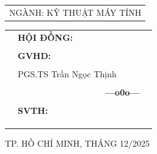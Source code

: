 \documentclass[11pt, a4paper]{report}
\theoremstyle{definition}
\begin{document}
\begin{titlepage}
\begin{center}
\begin{tabular}{c}
{\Large NGÀNH: KỸ THUẬT MÁY TÍNH}
\end{tabular}
\end{center}
\begin{table}[h]
\begin{tabular}{rll}
\hspace{5 cm} &  \textbf{\Large HỘI ĐỒNG:} {}
\\
\vspace{2cm}
\\
\hspace{5cm} &   \textbf{\Large GVHD:} \hspace{1.3cm}{\Large Th.S Huỳnh Phúc Nghị}
\\
\\
& \hspace{3.23cm} \Large{PGS.TS Trần Ngọc Thịnh}
\\
\\
\hspace{4 cm} &     \textbf{$\;$ $\;$$\;$$\;$$\;$$\;$$\;$$\;$$\;$$\;$$\;$$\;$$\;$$\;$$\;$$\;$$\;$$\;$$\;$$\;$$\;$$\;$$\;$$\;$$\;$$\;$$\;$$\;$$\;$$\;$$\;$$\;$$\;$$\;$ \Large ---o0o---} 
\\
\\
\hspace{4 cm} &   \textbf{\Large SVTH:} \hspace{1.5cm}{\Large Nguyễn Văn Nam - 2114121}
\\
\\
\\
\\
\end{tabular}
\end{table}
\vspace{0.5cm}
\begin{center}
{\Large TP. HỒ CHÍ MINH, THÁNG 12/2025 }
\end{center}
\end{titlepage}
\newpage
% 
\hypersetup{pageanchor=true}

\newpage

\newpage

\newpage
\tableofcontents
\newpage
\listoffigures
\newpage
\listoftables
\clearpage
{}
\end{document}
